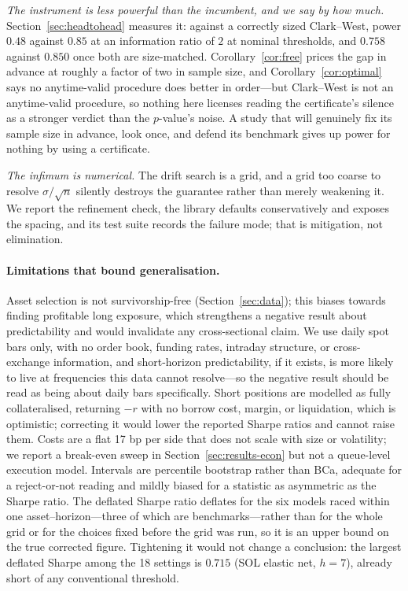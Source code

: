 \documentclass{article}
\theoremstyle{plain}
\theoremstyle{definition}
\begin{document}
\emph{The instrument is less powerful than the incumbent, and we say by how much.}
Section~\ref{sec:headtohead} measures it: against a correctly sized Clark--West, power $0.48$
against $0.85$ at an information ratio of $2$ at nominal thresholds, and $0.758$ against
$0.850$ once both are size-matched. Corollary~\ref{cor:free} prices the gap in advance at
roughly a factor of two in sample size, and Corollary~\ref{cor:optimal} says no anytime-valid
procedure does better in order---but Clark--West is not an anytime-valid procedure, so nothing
here licenses reading the certificate's silence as a stronger verdict than the $p$-value's
noise. A study that will genuinely fix its sample size in advance, look once, and defend its
benchmark gives up power for nothing by using a certificate.

\emph{The infimum is numerical.} The drift search is a grid, and a grid too coarse to resolve
$\sigma/\sqrt{n}$ silently destroys the guarantee rather than merely weakening it. We report
the refinement check, the library defaults conservatively and exposes the spacing, and its
test suite records the failure mode; that is mitigation, not elimination.

\paragraph{Limitations that bound generalisation.}
Asset selection is not survivorship-free (Section~\ref{sec:data}); this biases
towards finding profitable long exposure, which strengthens a negative result about
predictability and would invalidate any cross-sectional claim. We use daily spot
bars only, with no order book, funding rates, intraday structure, or cross-exchange
information, and short-horizon predictability, if it exists, is more likely to live
at frequencies this data cannot resolve---so the negative result should be read as
being about daily bars specifically. Short positions are modelled as fully
collateralised, returning $-r$ with no borrow cost, margin, or liquidation, which is
optimistic; correcting it would lower the reported Sharpe ratios and cannot raise
them. Costs are a flat 17 bp per side that does not scale with size or volatility; we report a
break-even sweep in Section~\ref{sec:results-econ} but not a queue-level execution model. Intervals are percentile bootstrap
rather than BCa, adequate for a reject-or-not reading and mildly biased for a
statistic as asymmetric as the Sharpe ratio. The deflated Sharpe ratio deflates for
the six models raced within one asset--horizon---three of which are
benchmarks---rather than for the whole grid or for the choices fixed before the grid
was run, so it is an upper bound on the true corrected figure. Tightening it would
not change a conclusion: the largest deflated Sharpe among the 18 settings is
$0.715$ (SOL elastic net, $h=7$), already short of any conventional threshold.
\end{document}
